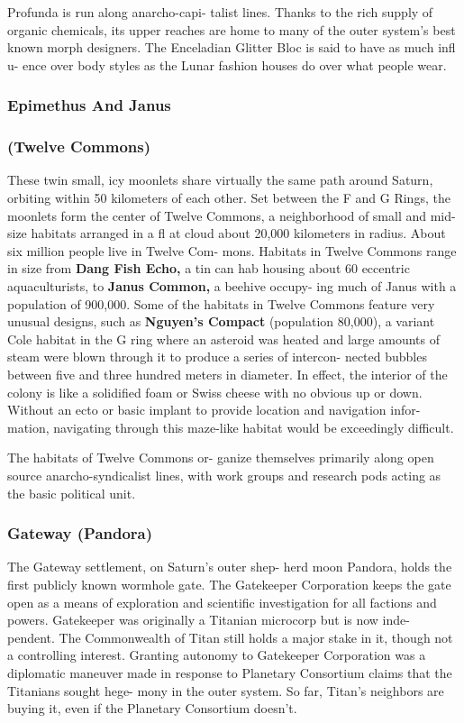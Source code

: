 Profunda is run along anarcho-capi-
talist lines. Thanks to the rich supply of 
organic chemicals, its upper reaches are 
home to many of the outer system's best 
known morph designers. The Enceladian 
Glitter Bloc is said to have as much infl u-
ence over body styles as the Lunar fashion 
houses do over what people wear.

\subsubsection{Epimethus And Janus}


\subsubsection{(Twelve Commons)}

These twin small, icy moonlets share 
virtually the same path around Saturn, 
orbiting within 50 kilometers of each 
other. Set between the F and G Rings, 
the moonlets form the center of Twelve 
Commons, a neighborhood of small and 
mid-size habitats arranged in a fl at cloud 
about 20,000 kilometers in radius. About 
six million people live in Twelve Com-
mons. Habitats in Twelve Commons range 
in size from \textbf{Dang Fish Echo,} a tin can hab 
housing about 60 eccentric aquaculturists, 
to  \textbf{Janus Common,} a beehive occupy-
ing much of Janus with a population of 
900,000. Some of the habitats in Twelve 
Commons feature very unusual designs, 
such as \textbf{Nguyen's Compact} (population 
80,000), a variant Cole habitat in the 
G ring where an asteroid was heated 
and large amounts of steam were blown 
through it to produce a series of intercon-
nected bubbles between five and three 
hundred meters in diameter. In effect, the 
interior of the colony is like a solidified 
foam or Swiss cheese with no obvious up 
or down. Without an ecto or basic implant 
to provide location and navigation infor-
mation, navigating through this maze-like 
habitat would be exceedingly difficult.

The habitats of Twelve Commons or-
ganize themselves primarily along open 
source anarcho-syndicalist lines, with 
work groups and research pods acting as 
the basic political unit.

\subsubsection{Gateway (Pandora)}

The Gateway settlement, on Saturn's outer shep-
herd moon Pandora, holds the first publicly known 
wormhole gate. The Gatekeeper Corporation keeps 
the gate open as a means of exploration and scientific 
investigation for all factions and powers. Gatekeeper 
was originally a Titanian microcorp but is now inde-
pendent. The Commonwealth of Titan still holds a 
major stake in it, though not a controlling interest. 
Granting autonomy to Gatekeeper Corporation was 
a diplomatic maneuver made in response to Planetary 
Consortium claims that the Titanians sought hege-
mony in the outer system. So far, Titan's neighbors are 
buying it, even if the Planetary Consortium doesn't.

